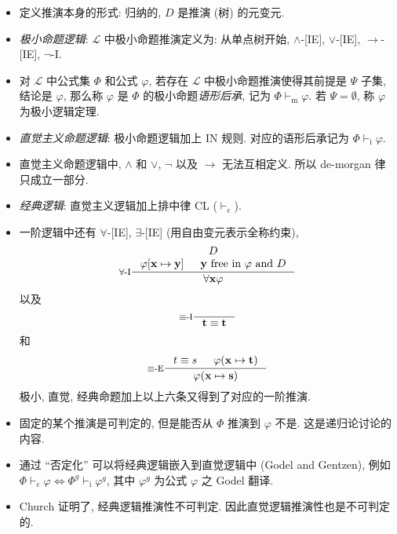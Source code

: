 \documentclass[a4paper]{article}
\begin{document}
\begin{itemize}
    \item 定义推演本身的形式: 归纳的, $D$ 是推演 (树) 的元变元.

    \item \emph{极小命题逻辑}: $\mathcal{L}$ 中极小命题推演定义为: 从单点树开始, $\land$-[IE], $\lor$-[IE], $\to$-[IE], $\lnot$-I.
    \item 对 $\mathcal{L}$ 中公式集 $\Phi$ 和公式 $\varphi$, 若存在
        $\mathcal{L}$ 中极小命题推演使得其前提是 $\Psi$ 子集, 结论是 $\varphi$,
        那么称 $\varphi$ 是 $\Phi$ 的极小命题\emph{语形后承}, 记为 $\Phi
        \vdash_{\text{m}} \varphi$. 若 $\Psi=\emptyset$, 称 $\varphi$
        为极小逻辑定理.

    \item \emph{直觉主义命题逻辑}: 极小命题逻辑加上 IN 规则. 对应的语形后承记为 $\Phi \vdash_{\text{i}} \varphi$.

    \item 直觉主义命题逻辑中, $\land$ 和 $\lor$, $\lnot$ 以及 $\to$ 无法互相定义.
        所以 de-morgan 律只成立一部分.

    \item \emph{经典逻辑}: 直觉主义逻辑加上排中律 CL ($\vdash_{\text{c}}$).

    \item 一阶逻辑中还有 $\forall$-[IE], $\exists$-[IE] (用自由变元表示全称约束),
        \[ \inference[$\forall$-I]
            { D \\ \varphi[\mathbf{x}\mapsto\mathbf{y}] & \mathbf{y}\text{ free in }\varphi\text{ and }D}
            { \forall \mathbf{x}\varphi}
        \]
        以及
        \[\inference[$\equiv$-I]{}{\mathbf{t}\equiv \mathbf{t}}\] 和 \[\inference[$\equiv$-E]{t\equiv s & \varphi(\mathbf{x}\mapsto \mathbf{t})}{\varphi(\mathbf{x}\mapsto \mathbf{s})}\]
        极小, 直觉, 经典命题加上以上六条又得到了对应的一阶推演.

    \item 固定的某个推演是可判定的, 但是能否从 $\Phi$ 推演到 $\varphi$ 不是. 这是递归论讨论的内容.

    \item 通过 ``否定化'' 可以将经典逻辑嵌入到直觉逻辑中 (Godel and Gentzen), 例如 $\Phi \vdash_{\text{c}} \varphi \Leftrightarrow \Phi^g \vdash_{\text{i}} \varphi^g$, 其中 $\varphi^g$ 为公式 $\varphi$ 之 Godel 翻译.

    \item Church 证明了, 经典逻辑推演性不可判定. 因此直觉逻辑推演性也是不可判定的.
\end{itemize}
\end{document}
